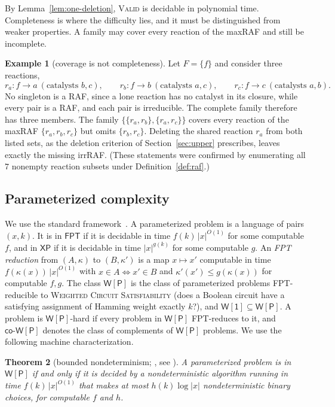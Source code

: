 \documentclass[11pt,a4paper]{article}
\theoremstyle{plain}
\newtheorem{theorem}{Theorem}[section]
\theoremstyle{definition}
\newtheorem{example}[theorem]{Example}
\theoremstyle{remark}
\newcommand{\Valid}{\textup{\textsc{Valid}}}
\newcommand{\FPT}{\mathsf{FPT}}
\newcommand{\XP}{\mathsf{XP}}
\newcommand{\WP}{\mathsf{W[P]}}
\newcommand{\coWP}{\mathsf{co\text{-}W[P]}}
\newcommand{\Wone}{\mathsf{W[1]}}
\begin{document}
By Lemma~\ref{lem:one-deletion}, \Valid{} is decidable in polynomial time. Completeness is where the difficulty lies, and it must be distinguished from weaker properties. A family may cover every reaction of the maxRAF and still be incomplete.

\begin{example}[coverage is not completeness]\label{ex:three}
Let $F=\{f\}$ and consider three reactions,
\[
r_a\colon f\to a\ (\text{catalysts } b,c),\qquad
r_b\colon f\to b\ (\text{catalysts } a,c),\qquad
r_c\colon f\to c\ (\text{catalysts } a,b).
\]
No singleton is a RAF, since a lone reaction has no catalyst in its closure, while every pair is a RAF, and each pair is irreducible. The complete family therefore has three members. The family $\{\{r_a,r_b\},\{r_a,r_c\}\}$ covers every reaction of the maxRAF $\{r_a,r_b,r_c\}$ but omits $\{r_b,r_c\}$. Deleting the shared reaction $r_a$ from both listed sets, as the deletion criterion of Section~\ref{sec:upper} prescribes, leaves exactly the missing irrRAF. (These statements were confirmed by enumerating all $7$ nonempty reaction subsets under Definition~\ref{def:raf}.)
\end{example}

\subsection{Parameterized complexity}\label{sec:param}

We use the standard framework~\cite{downey1999parameterized,flum2006parameterized,downey2013fundamentals}. A parameterized problem is a language of pairs $(x,k)$. It is in $\FPT$ if it is decidable in time $f(k)\,|x|^{O(1)}$ for some computable $f$, and in $\XP$ if it is decidable in time $|x|^{g(k)}$ for some computable $g$. An \emph{FPT reduction} from $(A,\kappa)$ to $(B,\kappa')$ is a map $x\mapsto x'$ computable in time $f(\kappa(x))\,|x|^{O(1)}$ with $x\in A\iff x'\in B$ and $\kappa'(x')\le g(\kappa(x))$ for computable $f,g$. The class $\WP$ is the class of parameterized problems FPT-reducible to \textsc{Weighted Circuit Satisfiability} (does a Boolean circuit have a satisfying assignment of Hamming weight exactly $k$?), and $\Wone\subseteq\WP$. A problem is $\WP$-hard if every problem in $\WP$ FPT-reduces to it, and $\coWP$ denotes the class of complements of $\WP$ problems. We use the following machine characterization.

\begin{theorem}[bounded nondeterminism; \cite{cai1995structure}, see {\cite[Chapter~3]{flum2006parameterized}}]\label{thm:bounded-nondet}
A parameterized problem is in $\WP$ if and only if it is decided by a nondeterministic algorithm running in time $f(k)\,|x|^{O(1)}$ that makes at most $h(k)\log|x|$ nondeterministic binary choices, for computable $f$ and $h$.
\end{theorem}
\end{document}
